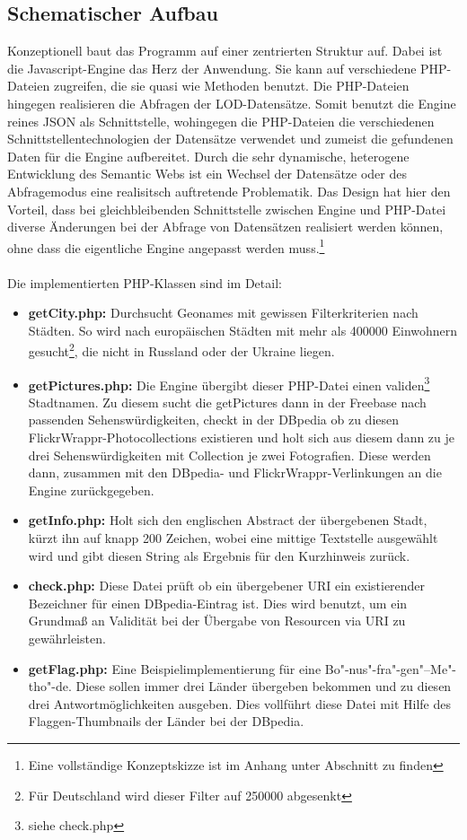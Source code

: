 \documentclass[a4paper, 11pt]{article}
\begin{document}
\subsection{Schematischer Aufbau}
Konzeptionell baut das Programm auf einer zentrierten Struktur auf. Dabei ist die Javascript-Engine das Herz der Anwendung. Sie kann auf verschiedene PHP-Dateien zugreifen, die sie quasi wie Methoden benutzt. Die PHP-Dateien hingegen realisieren die Abfragen der LOD-Datensätze. Somit benutzt die Engine reines JSON als Schnittstelle, wohingegen die PHP-Dateien die verschiedenen Schnittstellentechnologien der Datensätze verwendet und zumeist die gefundenen Daten für die Engine aufbereitet. Durch die sehr dynamische, heterogene Entwicklung des Semantic Webs ist ein Wechsel der Datensätze oder des Abfragemodus eine realisitsch auftretende Problematik. Das Design hat hier den Vorteil, dass bei gleichbleibenden Schnittstelle zwischen Engine und PHP-Datei diverse Änderungen bei der Abfrage von Datensätzen realisiert werden können, ohne dass die eigentliche Engine angepasst werden muss.\footnote{Eine vollständige Konzeptskizze ist im Anhang unter Abschnitt \pageref{pic:Konzept} zu finden}\\\\
Die implementierten PHP-Klassen sind im Detail:
\begin{itemize}
\label{sec:getCity}
\item \textbf{getCity.php:} Durchsucht Geonames mit gewissen Filterkriterien nach Städten. So wird nach europäischen Städten mit mehr als 400000 Einwohnern gesucht\footnote{Für Deutschland wird dieser Filter auf 250000 abgesenkt}, die nicht in Russland oder der Ukraine liegen.
\item \textbf{getPictures.php:} Die Engine übergibt dieser PHP-Datei einen validen\footnote{siehe check.php } Stadtnamen. Zu diesem sucht die getPictures dann in der Freebase nach passenden Sehenswürdigkeiten, checkt in der DBpedia ob zu diesen FlickrWrappr-Photocollections existieren und holt sich aus diesem dann zu je drei Sehenswürdigkeiten mit Collection je zwei Fotografien. Diese werden dann, zusammen mit den DBpedia- und FlickrWrappr-Verlinkungen an die Engine zurückgegeben.
\item \textbf{getInfo.php:} Holt sich den englischen Abstract der übergebenen Stadt, kürzt ihn auf knapp 200 Zeichen, wobei eine mittige Textstelle ausgewählt wird und gibt diesen String als Ergebnis für den Kurzhinweis zurück.
\label{sec:check}
\item \textbf{check.php:} Diese Datei prüft ob ein übergebener URI ein existierender Bezeichner für einen DBpedia-Eintrag ist. Dies wird benutzt, um ein Grundmaß an Validität bei der Übergabe von Resourcen via URI zu gewährleisten.
\item \textbf{getFlag.php:} Eine Beispielimplementierung für eine Bo"-nus"-fra"-gen"--Me"-tho"-de. Diese sollen immer drei Länder übergeben bekommen und zu diesen drei Antwortmöglichkeiten ausgeben. Dies vollführt diese Datei mit Hilfe des Flaggen-Thumbnails der Länder bei der DBpedia.
\end{itemize}
\end{document}
